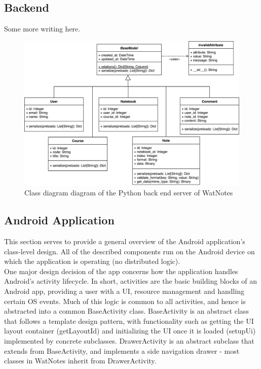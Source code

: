 \documentclass[12pt]{article}
\begin{document}
  \subsection{Backend}
    Some more writing here.
    \begin{figure}[H]
      \includegraphics[width=\textwidth]{assets/backend-class.pdf}
      \caption{Class diagram diagram of the Python back end server of WatNotes}
    \end{figure}

  \subsection{Android Application}
    This section serves to provide a general overview of the Android application's class-level design. All of the described components run on the Android
    device on which the application is operating (no distributed logic). \\

    One major design decision of the app concerns how the application handles Android's activity lifecycle. In short, activities are the basic building blocks of
    an Android app, providing a user with a UI, resource management and handling certain OS events. Much of this logic is common to all activities, and
    hence is abstracted into a common BaseActivity class. BaseActivity is an abstract class that follows a template design pattern, with functionality
    such as getting the UI layout container (getLayoutId) and initializing the UI once it is loaded (setupUi) implemented by concrete subclasses. DrawerActivity
    is an abstract subclass that extends from BaseActivity, and implements a side navigation drawer - most classes in WatNotes inherit from DrawerActivity. \\
\end{document}
